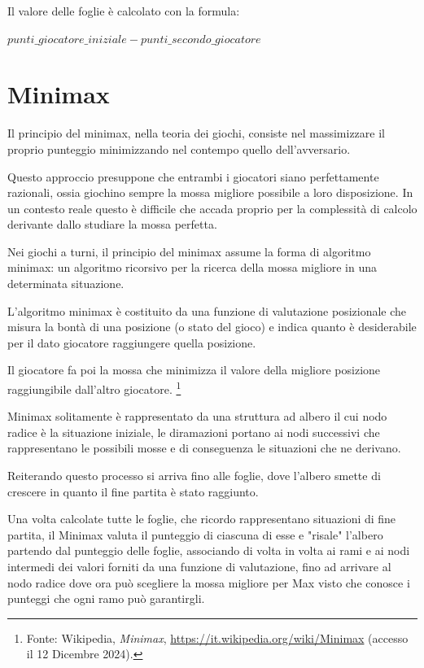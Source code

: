 \documentclass[a4paper,12pt]{report}
\begin{document}
Il valore delle foglie è calcolato con la formula: 

\(punti\_giocatore\_iniziale - punti\_secondo\_giocatore\)


\section{Minimax}

Il principio del minimax, nella teoria dei giochi, consiste nel massimizzare il proprio punteggio minimizzando nel contempo quello dell'avversario.

Questo approccio presuppone che entrambi i giocatori siano perfettamente razionali, ossia giochino sempre la mossa migliore possibile a loro disposizione.
In un contesto reale questo è difficile che accada proprio per la complessità di calcolo derivante dallo studiare la mossa perfetta.

Nei giochi a turni, il principio del minimax assume la forma di algoritmo minimax: un algoritmo ricorsivo per la ricerca della mossa migliore in una determinata situazione. 

L'algoritmo minimax è costituito da una funzione di valutazione posizionale che misura la bontà di una posizione (o stato del gioco) e indica quanto è desiderabile per il dato giocatore raggiungere quella posizione.

Il giocatore fa poi la mossa che minimizza il valore della migliore posizione raggiungibile dall'altro giocatore. \footnote{Fonte: Wikipedia, \emph{Minimax}, \url{https://it.wikipedia.org/wiki/Minimax} (accesso il 12 Dicembre 2024).}

Minimax solitamente è rappresentato da una struttura ad albero il cui nodo radice è la situazione iniziale, le diramazioni portano ai nodi successivi che rappresentano le possibili mosse e di conseguenza le situazioni che ne derivano.

Reiterando questo processo si arriva fino alle foglie, dove l'albero smette di crescere in quanto il fine partita è stato raggiunto.

Una volta calcolate tutte le foglie, che ricordo rappresentano situazioni di fine partita, il Minimax valuta il punteggio di ciascuna di esse e "risale" l'albero partendo dal punteggio delle foglie, associando di volta in volta ai rami e ai nodi intermedi dei valori forniti da una funzione di valutazione, fino ad arrivare al nodo radice dove ora può scegliere la mossa migliore per Max visto che conosce i punteggi che ogni ramo può garantirgli.
\end{document}
